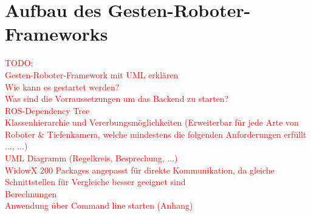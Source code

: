 
\section{Aufbau des Gesten-Roboter-Frameworks}
\textcolor{red}{TODO:\\
Gesten-Roboter-Framework mit UML erklären\\
Wie kann es gestartet werden?\\
Was sind die Vorraussetzungen um das Backend zu starten?\\
ROS-Dependency Tree\\
Klassenhierarchie und Vererbungsmöglichkeiten (Erweiterbar für jede Arte von Roboter \& Tiefenkamera, welche mindestens die folgenden Anforderungen erfüllt ..., ...)\\
UML Diagramm (Regelkreis, Besprechung, ...)\\
WidowX 200 Packages angepasst für direkte Kommunikation, da gleiche Schnittstellen für Vergleiche besser geeignet sind\\
Berechnungen\\
Anwendung über Command line starten (Anhang)
}

